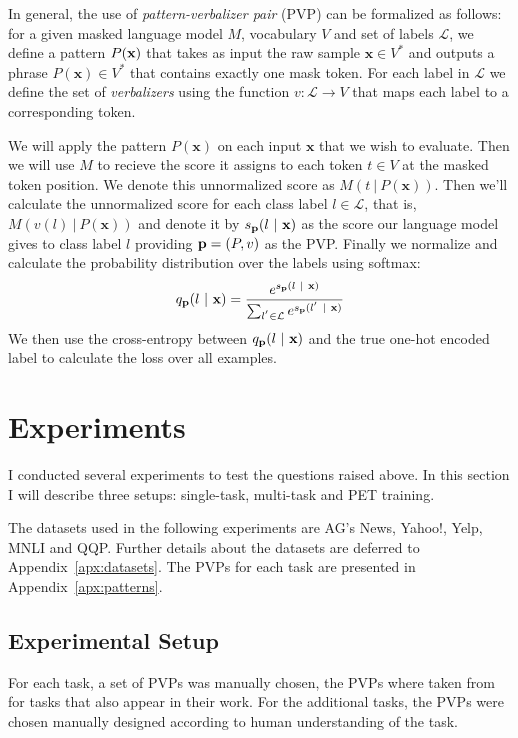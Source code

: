 \documentclass[11pt,a4paper]{article}
\begin{document}
In general, the use of \textit{pattern-verbalizer pair} (PVP) can be formalized as follows: for a given masked language model $M$, vocabulary $V$ and set of labels $\mathcal{L}$, we define a pattern $P(\textbf{\text{x}})$ that takes as input the raw sample $\textbf{x}\in{}V^*$ and outputs a phrase $P(\textbf{x})\in{}V^*$ that contains exactly one mask token.
For each label in $\mathcal{L}$ we define the set of \textit{verbalizers} using the function $v:\mathcal{L}\rightarrow{}V$ that maps each label to a corresponding token.

We will apply the pattern $P(\textbf{x})$ on each input $\textbf{x}$ that we wish to evaluate.
Then we will use $M$ to recieve the score it assigns to each token $t\in{}V$ at the masked token position.
We denote this unnormalized score as $M(t\ |\ P(\textbf{x}))$.
Then we'll calculate the unnormalized score for each class label $l\in{}\mathcal{L}$, that is, $M(v(l)\ |\ P(\textbf{x}))$ and denote it by $s_{\text{\textbf{p}}}(l\ |\ \textbf{x})$ as the score our language model gives to class label $l$ providing $\text{\textbf{p}}=(P, v)$ as the PVP.
Finally we normalize and calculate the probability distribution over the labels using softmax:
\[
	q_\text{\textbf{p}}(l\ |\ \textbf{x}) = \frac{e^{s_{\text{\textbf{p}}}(l\ |\ \textbf{x})}}{\sum_{l^{'}\in{}\mathcal{L}}e^{s_{\text{\textbf{p}}}(l^{'}\ |\ \textbf{x})}}
\]
We then use the cross-entropy between $q_\text{\textbf{p}}(l\ |\ \textbf{x})$ and the true one-hot encoded label to calculate the loss over all examples. 

\section{Experiments}
\label{sec:experiments}




I conducted several experiments to test the questions raised above.
In this section I will describe three setups: single-task, multi-task and PET training.

The datasets used in the following experiments are AG's News, Yahoo!, Yelp, MNLI and QQP.
Further details about the datasets are deferred to Appendix~\ref{apx:datasets}.
The PVPs for each task are presented in Appendix~\ref{apx:patterns}.

\subsection{Experimental Setup}
\label{sub-sec:experimental-setup}
For each task, a set of PVPs was manually chosen, the PVPs where taken from \citet{schick2020exploiting} for tasks that also appear in their work.
For the additional tasks, the PVPs were chosen manually designed according to human understanding of the task. 
\end{document}
